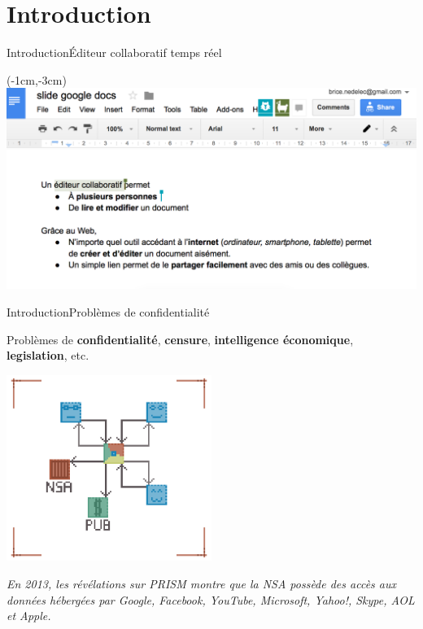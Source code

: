 \section{Introduction}

\begin{frame}{Introduction}{Éditeur collaboratif temps réel}

  \begin{textblock*}{\textwidth}(-1cm,-3cm) 
    \includegraphics[width=1.19\textwidth]{img/googledocs.png}
  \end{textblock*}
  
\end{frame}


\begin{frame}{Introduction}{Problèmes de confidentialité}
  
  Problèmes de \textbf{confidentialité}, \textbf{censure},
  \textbf{intelligence économique}, \textbf{legislation}, etc.

  \vspace{0.5cm}
  \begin{center}
    \includegraphics[width=0.5\textwidth]{img/centralizedethicproblems.png}
  \end{center}
  
  \vspace{0.5cm}

  \textit{En 2013, les révélations sur PRISM montre que la NSA possède des
    accès aux données hébergées par Google, Facebook, YouTube, Microsoft,
    Yahoo!, Skype, AOL et Apple.}

\end{frame}

